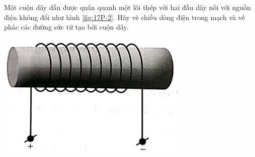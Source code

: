 \begin{ex}
	Một cuộn dây dẫn được quấn quanh một lõi thép với hai đầu dây nối với nguồn điện không đổi như hình \ref{fig:17P-2}. Hãy vẽ chiều dòng điện trong mạch và vẽ phác các đường sức từ tạo bởi cuộn dây.
	\begin{center}
		\includegraphics[width=0.3\linewidth]{figs/VN12-Y24-PH-SYL-017P-2}
		\label{fig:17P-2}
	\end{center}
\end{ex}
